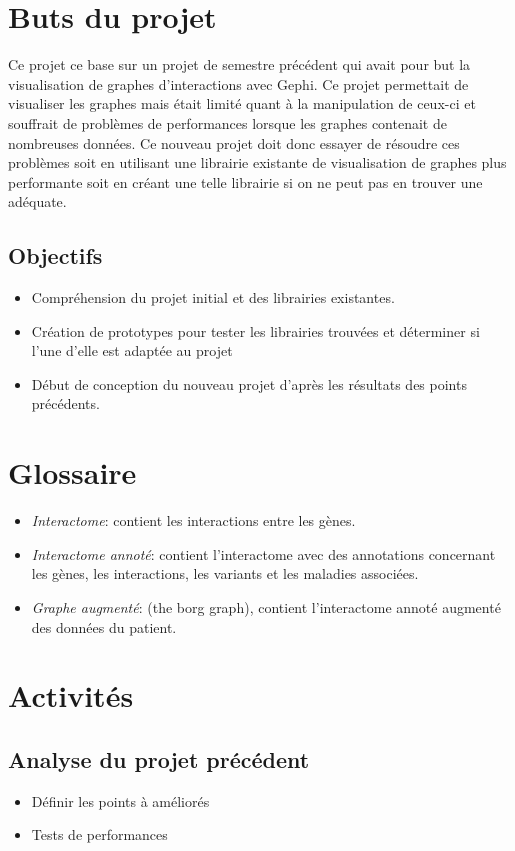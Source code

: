 \documentclass{article}
\begin{document}
\section{Buts du projet}
  Ce projet ce base sur un projet de semestre précédent qui avait pour but la visualisation de graphes d'interactions avec Gephi. Ce projet permettait de visualiser les graphes mais était limité quant à la manipulation de ceux-ci et souffrait de problèmes de performances lorsque les graphes contenait de nombreuses données.
  Ce nouveau projet doit donc essayer de résoudre ces problèmes soit en utilisant une librairie existante de visualisation de graphes plus performante soit en créant une telle librairie si on ne peut pas en trouver une adéquate.
  \subsection{Objectifs}
  \begin{itemize}
    \item Compréhension du projet initial et des librairies existantes.
    \item Création de prototypes pour tester les librairies trouvées et déterminer si l'une d'elle est adaptée au projet
    \item Début de conception du nouveau projet d'après les résultats des points précédents.
  \end{itemize}

\section{Glossaire}
  \begin{itemize}
    \item \textit{Interactome}: contient les interactions entre les gènes.
    \item \textit{Interactome annoté}: contient l'interactome avec des annotations concernant les gènes, les interactions, les variants et les maladies associées.
    \item \textit{Graphe augmenté}: (the borg graph), contient l'interactome annoté augmenté des données du patient.
  \end{itemize}
\cite{Sisto:2014}

\section{Activités}
  \subsection{Analyse du projet précédent}
    \begin{itemize}
      \item Définir les points à améliorés
      \item Tests de performances
    \end{itemize}
\end{document}
